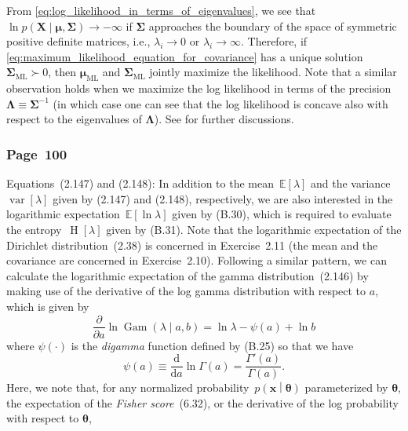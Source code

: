 \documentclass[12pt,a4paper]{article}
\newcommand{\erratum}[1]{%
\subsubsection*{#1}
\addcontentsline{toc}{subsection}{#1}}
\begin{document}
From \eqref{eq:log_likelihood_in_terms_of_eigenvalues}, we see that
$\ln p\left(\mathbf{X}\middle| \bm{\mu}, \bm{\Sigma}\right) \to -\infty$
if $\bm{\Sigma}$ approaches the boundary of the space of symmetric positive definite matrices,
i.e., $\lambda_i \to 0$ or $\lambda_i \to \infty$.
Therefore, if \eqref{eq:maximum_likelihood_equation_for_covariance}
has a unique solution~$\bm{\Sigma}_\text{ML} \succ 0$,
then $\bm{\mu}_\text{ML}$ and $\bm{\Sigma}_\text{ML}$ jointly maximize the likelihood.
Note that a similar observation holds when we maximize the log likelihood in terms of
the precision~$\bm{\Lambda} \equiv \bm{\Sigma}^{-1}$
(in which case one can see that the log likelihood is concave also with respect to
the eigenvalues of $\bm{\Lambda}$).
See \citet{Anderson:MaximumLikelihood} for further discussions.

\erratum{Page~100}
Equations~(2.147) and (2.148):
In addition to the mean~$\mathbb{E}[\lambda]$ and the variance~$\operatorname{var}[\lambda]$
given by (2.147) and (2.148), respectively,
we are also interested in the logarithmic expectation~$\mathbb{E}\left[ \ln\lambda \right]$
given by (B.30), which is required to evaluate
the entropy~$\operatorname{H}\left[ \lambda \right]$ given by (B.31).
Note that the logarithmic expectation of the Dirichlet distribution~(2.38) is
concerned in Exercise~2.11 (the mean and the covariance are concerned in Exercise~2.10).
Following a similar pattern, we can calculate the logarithmic expectation of
the gamma distribution~(2.146)
by making use of the derivative of the log gamma distribution with respect to $a$,
which is given by
\begin{equation}
\frac{\partial}{\partial a} \ln\operatorname{Gam}\left(\lambda\middle|a, b\right)
= \ln\lambda - \psi(a) + \ln b
\label{eq:derivative_of_log_gamma_distribution_wrt_a}
\end{equation}
where $\psi(\cdot)$ is the \emph{digamma} function defined by (B.25) so that we have
\begin{equation}
\psi(a) \equiv \frac{\mathrm{d}}{\mathrm{d}a} \ln \Gamma(a) = \frac{\Gamma'(a)}{\Gamma(a)} .
\end{equation}
Here, we note that, for any normalized probability~$p\left(\mathbf{x}\middle|\bm{\theta}\right)$
parameterized by $\bm{\theta}$, the expectation of the \emph{Fisher score}~(6.32),
or the derivative of the log probability with respect to $\bm{\theta}$,
\end{document}
